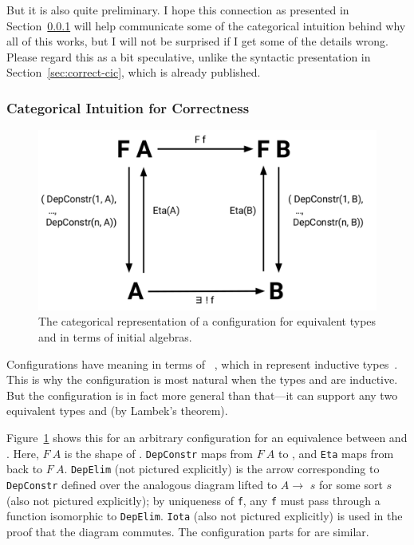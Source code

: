 But it is also quite preliminary. I hope this connection as presented in Section~\ref{sec:algebra} will help 
communicate some of the categorical intuition behind why all of this works, but I will not be surprised if I get some of the details wrong.
Please regard this as a bit speculative, unlike the syntactic presentation in Section~\ref{sec:correct-cic},
which is already published.

\subsubsection{Categorical Intuition for Correctness}
\label{sec:algebra}

\begin{figure}
\begin{center}
\includegraphics[scale=0.40]{often/Diagram}
\end{center}
\caption{The categorical representation of a configuration for equivalent types \Aa and \B in terms of initial algebras.}
\label{fig:lambek}
\end{figure}

Configurations have meaning in terms of ~\cite{nlab:initial_algebra_of_an_endofunctor},
which in  represent inductive types~\cite{univalent2013homotopy}.
This is why the configuration is most natural when the types \Aa and \B are inductive.
But the configuration is in fact more general than that---it can support any two equivalent types \Aa and \B (by Lambek's theorem).

Figure~\ref{fig:lambek} shows this for an arbitrary configuration for an equivalence between \Aa and \B.
Here, $F\ A$ is the shape of \Aa.
\lstinline{DepConstr} maps from $F\ A$ to \Aa, and \lstinline{Eta} maps from \Aa back to $F\ A$.
\lstinline{DepElim} (not pictured explicitly) is the arrow corresponding to \lstinline{DepConstr} defined over the analogous diagram
lifted to $A \rightarrow$ $s$ for some sort $s$ (also not pictured explicitly);
by uniqueness of \lstinline{f}, any \lstinline{f} must pass through a function 
isomorphic to \lstinline{DepElim}.
\lstinline{Iota} (also not pictured explicitly) is used in the proof that the diagram commutes.
The configuration parts for \B are similar.

